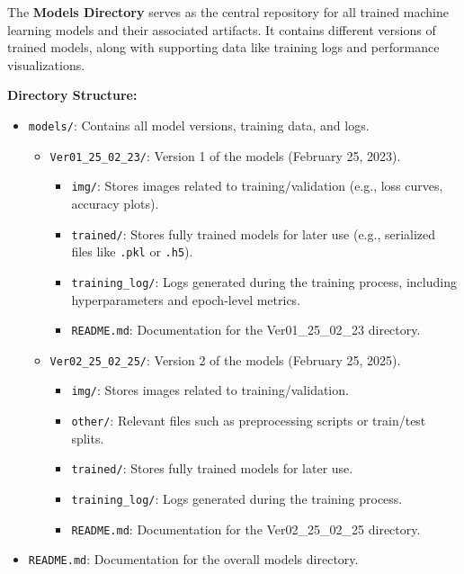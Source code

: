 The \textbf{Models Directory} serves as the central repository for all trained machine learning models and their associated artifacts. It contains different versions of trained models, along with supporting data like training logs and performance visualizations.

\textbf{Directory Structure:}
\begin{itemize}
    \item \texttt{models/}: Contains all model versions, training data, and logs.
    \begin{itemize}
        \item \texttt{Ver01\_25\_02\_23/}: Version 1 of the models (February 25, 2023).
        \begin{itemize}
            \item \texttt{img/}: Stores images related to training/validation (e.g., loss curves, accuracy plots).
            \item \texttt{trained/}: Stores fully trained models for later use (e.g., serialized files like \texttt{.pkl} or \texttt{.h5}).
            \item \texttt{training\_log/}: Logs generated during the training process, including hyperparameters and epoch-level metrics.
            \item \texttt{README.md}: Documentation for the Ver01\_25\_02\_23 directory.
        \end{itemize}
        \item \texttt{Ver02\_25\_02\_25/}: Version 2 of the models (February 25, 2025).
        \begin{itemize}
            \item \texttt{img/}: Stores images related to training/validation.
            \item \texttt{other/}: Relevant files such as preprocessing scripts or train/test splits.
            \item \texttt{trained/}: Stores fully trained models for later use.
            \item \texttt{training\_log/}: Logs generated during the training process.
            \item \texttt{README.md}: Documentation for the Ver02\_25\_02\_25 directory.
        \end{itemize}
    \end{itemize}
    \item \texttt{README.md}: Documentation for the overall models directory.
\end{itemize}

